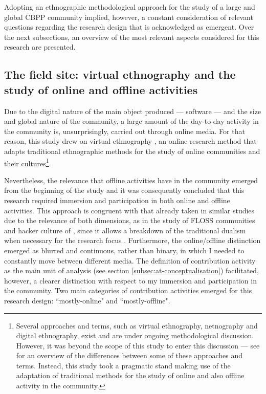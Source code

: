 Adopting an ethnographic methodological approach for the study of a large and global CBPP community implied, however, a constant consideration of relevant questions regarding the research design that is acknowledged as emergent. Over the next subsections, an overview of the most relevant aspects considered for this research are presented.

\subsection{The field site: virtual ethnography and the study of online and offline activities}
\label{subsec:field-site}

Due to the digital nature of the main object produced --- software --- and the size and global nature of the community, a large amount of the day-to-day activity in the community is, unsurprisingly, carried out through online media. For that reason, this study drew on virtual ethnography \parencite{hine2000virtualbook}, an online research method that adapts traditional ethnographic methods for the study of online communities and their cultures\footnote{Several approaches and terms, such as virtual ethnography, netnography and digital ethnography, exist and are under ongoing methodological discussion. However, it was beyond the scope of this study to enter this discussion --- see \textcite{caliandro2014} for an overview of the differences between some of these approaches and terms. Instead, this study took a pragmatic stand making use of the adaptation of traditional methods for the study of online and also offline activity in the community.}.

Nevertheless, the relevance that offline activities have in the community emerged from the beginning of the study and it was consequently concluded that this research required immersion and participation in both online and offline activities. This approach is congruent with that already taken in similar studies due to the relevance of both dimensions, as in the study of FLOSS communities and hacker culture of \textcite{coleman2013coding}, since it allows a breakdown of the traditional dualism when necessary for the research focus \parencite{orgad2005online}. Furthermore, the online\slash offline distinction emerged as blurred and continuous, rather than binary, in which I needed to constantly move between different media. The definition of contribution activity as the main unit of analysis (see section \ref{subsec:at-conceptualisation}) facilitated, however, a clearer distinction with respect to my immersion and participation in the community. Two main categories of contribution activities emerged for this research design: ``mostly-online" and ``mostly-offline". 

